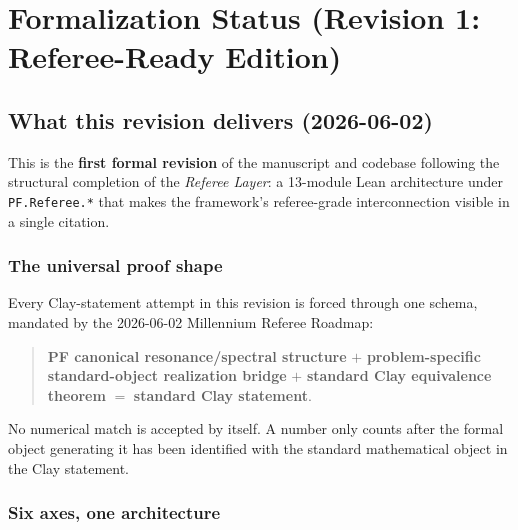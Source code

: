 \chapter*{Formalization Status (Revision 1: Referee-Ready Edition)}

\section*{What this revision delivers (2026-06-02)}

This is the \textbf{first formal revision} of the manuscript and codebase
following the structural completion of the \emph{Referee Layer}: a
13-module Lean architecture under \texttt{PF.Referee.*} that makes the
framework's referee-grade interconnection visible in a single citation.

\subsection*{The universal proof shape}

Every Clay-statement attempt in this revision is forced through one
schema, mandated by the 2026-06-02 Millennium Referee Roadmap:
\begin{quote}
\textbf{PF canonical resonance/spectral structure}
$+$ \textbf{problem-specific standard-object realization bridge}
$+$ \textbf{standard Clay equivalence theorem}
$=$ \textbf{standard Clay statement}.
\end{quote}
No numerical match is accepted by itself. A number only counts after
the formal object generating it has been identified with the standard
mathematical object in the Clay statement.

\subsection*{Six axes, one architecture}

